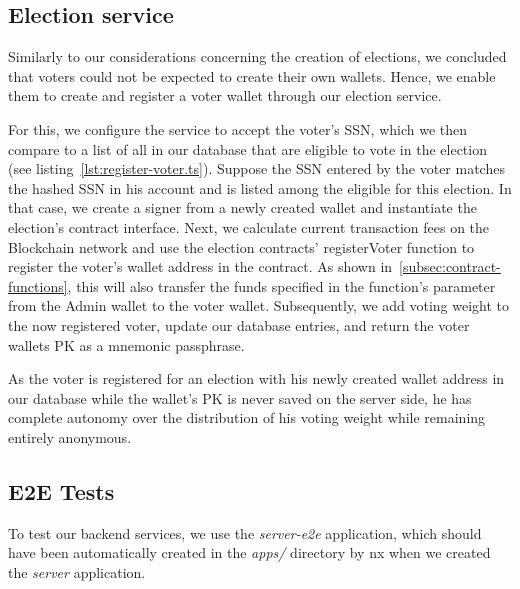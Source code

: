 
\subsection{Election service}\label{subsec:election-service}

Similarly to our considerations concerning the creation of elections, we concluded that voters could not be expected to create their own wallets.
Hence, we enable them to create and register a voter wallet through our election service.

For this, we configure the service to accept the voter's \gls{SSN}, which we then compare to a list of all  in our database that are eligible to vote in the election (see listing~\ref{lst:register-voter.ts}).
Suppose the \gls{SSN} entered by the voter matches the hashed \gls{SSN} in his account and is listed among the eligible  for this election.
In that case, we create a signer from a newly created wallet and instantiate the election's contract interface.
Next, we calculate current transaction fees on the \gls{Blockchain} network and use the election contracts' registerVoter function to register the voter's wallet address in the contract.
As shown in~\cref{subsec:contract-functions}, this will also transfer the funds specified in the function's parameter from the \gls{Admin} wallet to the voter wallet.
Subsequently, we add voting weight to the now registered voter, update our database entries, and return the voter wallets \gls{PK} as a mnemonic passphrase.

As the voter is registered for an election with his newly created wallet address in our database while the wallet's \gls{PK} is never saved on the server side, he has complete autonomy over the distribution of his voting weight while remaining entirely anonymous.


\subsection{E2E Tests}\label{subsec:e2e-tests}

To test our backend services, we use the \emph{server-e2e} application, which should have been automatically created in the \emph{apps/} directory by nx when we created the \emph{server} application.

